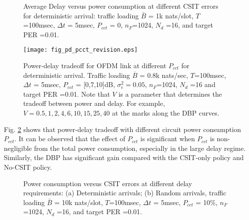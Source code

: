 \documentclass[11pt,journal, onecolumn]{./IEEEtran}
\newcommand{\black}{\color{black}}
\newcommand{\red}{\color{black}}
\begin{document}
\begin{figure}
\begin{center}
  \end{center}
    \caption{ \red Average Delay versus power consumption at different CSIT errors for deterministic arrival: traffic loading $\bar B$ =  1k nats/slot, $T$=100msec, $\Delta t$ = 5msec, $P_{cct}$ = 0, $n_F$=1024, $N_d$ =16, and target PER =0.01. }
    \label{fig_gradient} \black
\end{figure}

\black




\begin{figure}[h!]
\centering
\texttt{[image: fig\_pd\_pcct\_revision.eps]}
\caption{{\red Power-delay tradeoff for OFDM link at different $P_{cct}$ for deterministic arrival. Traffic loading $\overline  B$ =  0.8k nats/sec, $T$=100msec, $\Delta t$ = 5msec, $P_{cct}$ = [0,7,10]dB, $\sigma^2_e=0.05$, $n_F$=1024, $N_d$ =16 and target PER =0.01. Note that $V$ is a parameter that determines the tradeoff between power and delay. For example, $V=0.5,1,2,4, 6,10, 15,25,40$ at the marks along the DBP curves. } \black} \label{fig_pd_pcct} \black
\end{figure}

\black

{\red Fig. \ref{fig_pd_pcct} shows that power-delay tradeoff with different circuit power consumption $P_{cct}$. It can be observed that the effect of $P_{cct}$ is significant when $P_{cct}$ is non-negligible from the total power consumption, especially in the large delay regime. Similarly, the DBP has significant gain compared with the CSIT-only policy and No-CSIT policy.}







\begin{figure}
\begin{center}
  \end{center}
    \caption{{\red Power consumption versus CSIT errors at different delay requirements: (a) Deterministic arrivals; (b) Random arrivals, traffic loading $\bar B$ =  10k nats/slot, $T$=100msec, $\Delta t$ = 5msec, $P_{cct}$ = 10\%, $n_F$=1024, $N_d$ =16, and target PER =0.01.} \black }
    \label{fig_psig} \black
\end{figure}
\end{document}
